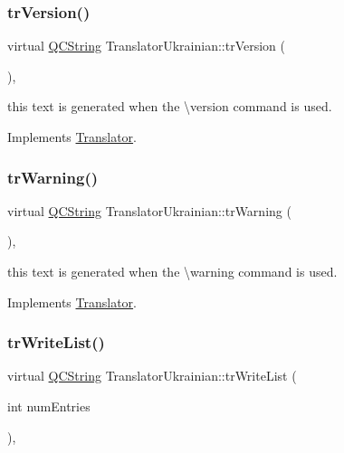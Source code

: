 \subsubsection{\texorpdfstring{trVersion()}{trVersion()}}
{\footnotesize\ttfamily virtual \mbox{\hyperlink{class_q_c_string}{Q\+C\+String}} Translator\+Ukrainian\+::tr\+Version (\begin{DoxyParamCaption}{ }\end{DoxyParamCaption})\hspace{0.3cm}{\ttfamily [inline]}, {\ttfamily [virtual]}}

this text is generated when the \textbackslash{}version command is used. 

Implements \mbox{\hyperlink{class_translator}{Translator}}.

\mbox{\label{class_translator_ukrainian_acc276e29156953a570d7e69731712b22}} 
\subsubsection{\texorpdfstring{trWarning()}{trWarning()}}
{\footnotesize\ttfamily virtual \mbox{\hyperlink{class_q_c_string}{Q\+C\+String}} Translator\+Ukrainian\+::tr\+Warning (\begin{DoxyParamCaption}{ }\end{DoxyParamCaption})\hspace{0.3cm}{\ttfamily [inline]}, {\ttfamily [virtual]}}

this text is generated when the \textbackslash{}warning command is used. 

Implements \mbox{\hyperlink{class_translator}{Translator}}.

\mbox{\label{class_translator_ukrainian_a08d784d98d5af1b0afdb38cc87773ea3}} 
\subsubsection{\texorpdfstring{trWriteList()}{trWriteList()}}
{\footnotesize\ttfamily virtual \mbox{\hyperlink{class_q_c_string}{Q\+C\+String}} Translator\+Ukrainian\+::tr\+Write\+List (\begin{DoxyParamCaption}\item[{int}]{num\+Entries }\end{DoxyParamCaption})\hspace{0.3cm}{\ttfamily [inline]}, {\ttfamily [virtual]}}

